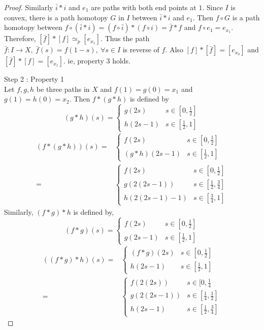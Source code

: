 \begin{proof}
	Similarly $\bar{i} \ast i$ and $e_1$ are paths with both end points at $1$. Since $I$ is convex, there is a path homotopy $G$ in $I$ between $\bar{i} \ast i$ and $e_1$. Then $f \circ G$ is a path homotopy between $f \circ (\bar{i} \ast i) = (f \circ \bar{i}) \ast (f \circ i) = \bar{f} \ast f$ and $f \circ e_1 = e_{x_1}$. Therefore, $[\bar{f}] \ast [f] \simeq_p [e_{x_1}]$. Thus the path $\bar{f} : I \to X,\ \bar{f}(s) = f(1-s),\ \forall s \in I$ is reverse of $f$. Also $[f] \ast [\bar{f}] = [e_{x_0}]$ and $[\bar{f}] \ast [f] = [e_{x_1}]$. ie, property 3 holds.

	Step 2 : Property 1 \\

	Let $f,g,h$ be three paths in $X$ and $f(1) = g(0) = x_1$ and $g(1) = h(0) = x_2$. Then $f \ast (g \ast h)$ is defined by 
	\[ (g \ast h)(s) = \begin{cases} g(2s) & s \in [0,\frac{1}{2}] \\ h(2s-1) & s \in [\frac{1}{2},1] \end{cases} \]
	\begin{align*}
		(f \ast (g\ast{}h))(s) =  & \begin{cases} f(2s) & s \in [0,\frac{1}{2}] \\ (g \ast h)(2s-1) & s \in [\frac{1}{2},1] \end{cases} \\
			= & \begin{cases} f(2s) & s \in [0,\frac{1}{2}] \\ g(2(2s-1)) & s \in [\frac{1}{2},\frac{3}{4}] \\ h(2(2s-1)-1) & s \in [\frac{3}{4},1] \end{cases}
	\end{align*}
	Similarly, $(f \ast g) \ast h$ is defined by,
	\[ (f \ast g)(s) = \begin{cases} f(2s) & s \in [0,\frac{1}{2}] \\ g(2s-1) & s \in [\frac{1}{2},1] \end{cases} \]
	\begin{align*}
		((f \ast g) \ast h)(s) = & \begin{cases} (f \ast g)(2s) & s \in [0,\frac{1}{2}] \\ h(2s-1) & s \in [\frac{1}{2},1] \end{cases} \\
			= & \begin{cases} f(2(2s)) & s \in [0,\frac{1}{4} \\ g(2(2s-1)) & s \in [\frac{1}{4},\frac{1}{2}] \\ h(2s-1) & s \in [\frac{1}{2},\frac{3}{4}] \end{cases}
	\end{align*}


\end{proof}
